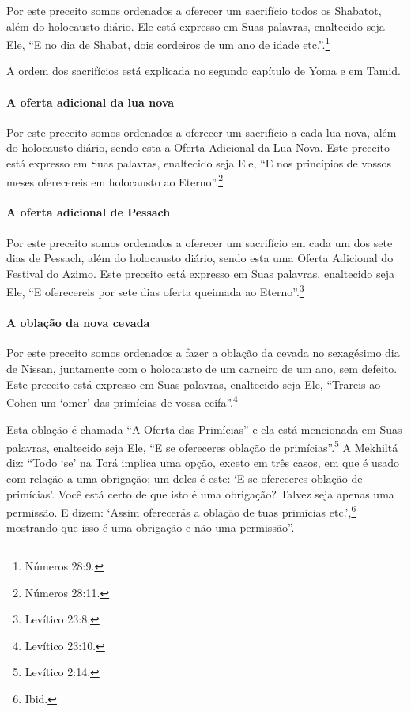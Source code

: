 Por este preceito somos ordenados a oferecer um sacrifício todos os
Shabatot, além do holocausto diário. Ele está expresso em Suas palavras,
enaltecido seja Ele, ``E no dia de Shabat, dois cordeiros de um ano de
idade etc.''.\footnote{Números 28:9.}

A ordem dos sacrifícios está explicada no segundo capítulo de Yoma e em
Tamid.

\paragraph{A oferta adicional da lua nova}

Por este preceito somos ordenados a oferecer um sacrifício a cada lua
nova, além do holocausto diário, sendo esta a Oferta Adicional da Lua
Nova. Este preceito está expresso em Suas palavras, enaltecido seja
Ele, ``E nos princípios de vossos meses oferecereis em holocausto ao
Eterno''.\footnote{Números 28:11.}

\paragraph{A oferta adicional de Pessach}

Por este preceito somos ordenados a oferecer um sacrifício em cada um
dos sete dias de Pessach, além do holocausto diário, sendo esta uma
Oferta Adicional do Festival do Azimo. Este preceito está expresso em
Suas palavras, enaltecido seja Ele, ``E oferecereis por sete dias
oferta queimada ao Eterno''.\footnote{Levítico 23:8.}

\paragraph{A oblação da nova cevada}

Por este preceito somos ordenados a fazer a oblação da cevada no
sexagésimo dia de Nissan, juntamente com o holocausto de um carneiro de
um ano, sem defeito. Este preceito está expresso em Suas palavras,
enaltecido seja Ele, ``Trareis ao Cohen um `omer' das primícias de
vossa ceifa''.\footnote{Levítico 23:10.}

Esta oblação é chamada ``A Oferta das Primícias'' e ela está mencionada
em Suas palavras, enaltecido seja Ele, ``E se ofereceres oblação de
primícias''.\footnote{Levítico 2:14.} A Mekhiltá diz: ``Todo `se' na Torá
implica uma opção, exceto em três casos, em que é usado com relação a
uma obrigação; um deles é este: `E se ofereceres oblação de primícias'.
Você está certo de que isto é uma obrigação? Talvez seja apenas uma
permissão. E dizem: `Assim oferecerás a oblação de tuas primícias etc.',\footnote{Ibid.} mostrando que isso é uma obrigação e não uma permissão''.

